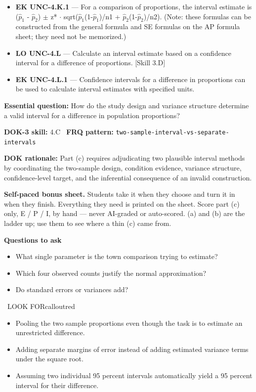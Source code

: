 \documentclass[11pt]{article}
\begin{document}
{\begin{itemize}[leftmargin=1.5em,itemsep=2pt,topsep=2pt]
  \item \textbf{EK UNC-4.K.1} --- For a comparison of proportions, the interval estimate is ($\widehat p_1$ - $\widehat p_2$) $\pm$ z* $\cdot$ sqrt($\widehat p_1$(1-$\widehat p_1$)/n1 + $\widehat p_2$(1-$\widehat p_2$)/n2). (Note: these formulas can be constructed from the general formula and SE formulas on the AP formula sheet; they need not be memorized.)
  \item \textbf{LO UNC-4.L} --- Calculate an interval estimate based on a confidence interval for a difference of proportions. [Skill 3.D]
  \item \textbf{EK UNC-4.L.1} --- Confidence intervals for a difference in proportions can be used to calculate interval estimates with specified units.
\end{itemize}
}
\textbf{Essential question:} How do the study design and variance structure determine a valid interval for a difference in population proportions?\par
\textbf{DOK-3 skill:} 4.C \textperiodcentered\ \textbf{FRQ pattern:} {\small\texttt{two-\allowbreak{}sample-\allowbreak{}interval-\allowbreak{}vs-\allowbreak{}separate-\allowbreak{}intervals}}\par
\textbf{DOK rationale:} Part (c) requires adjudicating two plausible interval methods by coordinating the two-sample design, condition evidence, variance structure, confidence-level target, and the inferential consequence of an invalid construction.\par

\textbf{Self-paced bonus sheet.} Students take it when they choose and turn it in when they finish. Everything they need is printed on the sheet. Score part (c) only, E / P / I, by hand --- never AI-graded or auto-scored. (a) and (b) are the ladder up; use them to see where a thin (c) came from.\par

\textbf{Questions to ask}
\begin{itemize}[leftmargin=1.5em,itemsep=2pt,topsep=2pt]
  \item What single parameter is the town comparison trying to estimate?
  \item Which four observed counts justify the normal approximation?
  \item Do standard errors or variances add?
\end{itemize}

\begin{callout}{\IconWarn\ LOOK FOR}{calloutred}
\begin{itemize}[leftmargin=1.5em,itemsep=2pt,topsep=2pt]
  \item Pooling the two sample proportions even though the task is to estimate an unrestricted difference.
  \item Adding separate margins of error instead of adding estimated variance terms under the square root.
  \item Assuming two individual 95 percent intervals automatically yield a 95 percent interval for their difference.
\end{itemize}
\end{callout}
\end{document}
